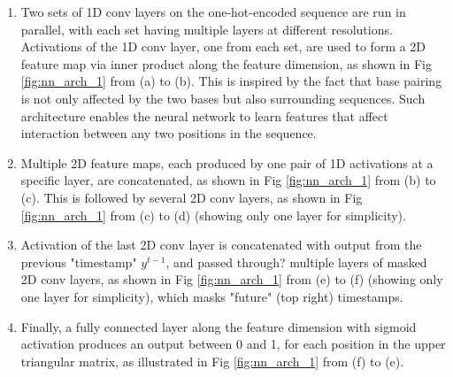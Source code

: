 \documentclass{article}
\begin{document}
\begin{enumerate}[leftmargin=*]

    \item \label{enum:step_1} Two sets of 1D conv layers on the one-hot-encoded sequence are run in parallel,
     with each set having multiple layers at different resolutions.
    Activations of the 1D conv layer, one from each set, are used to form a 2D feature map
via inner product along the feature dimension, as shown in Fig \ref{fig:nn_arch_1} from (a) to (b).
This is inspired by the fact that base pairing
is not only affected by the two bases but also surrounding sequences.
Such architecture enables the neural network to learn features that affect
interaction between any two positions in the sequence.

    \item \label{enum:step_2} Multiple 2D feature maps, each produced by one pair of 1D activations at a specific layer,
are concatenated, as shown in Fig \ref{fig:nn_arch_1} from (b) to (c).
This is followed by several 2D conv layers, as shown in Fig \ref{fig:nn_arch_1} from (c) to (d) (showing only one layer for simplicity).



    \item \label{enum:step_3} Activation of the last 2D conv layer is concatenated with output from the previous "timestamp" $y^{t-1}$,
and passed through? multiple layers of masked 2D conv layers, as shown in Fig \ref{fig:nn_arch_1} from (e) to (f)
(showing only one layer for simplicity),
which masks "future" (top right) timestamps.

    \item \label{enum:step_4} Finally, a fully connected layer along the feature dimension
   with sigmoid activation produces an output between 0 and 1,
    for each position in the upper triangular matrix, as illustrated in Fig \ref{fig:nn_arch_1} from (f) to (e).

\end{enumerate}
\end{document}
